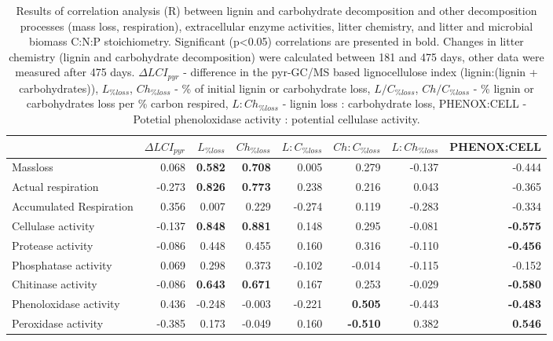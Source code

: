 \documentclass[10pt]{article}
\begin{document}
\begin{flushleft}
\begin{landscape}
\newpage
\begin{table}[h!]
\centering
\caption{Results of correlation analysis (R) between lignin and carbohydrate decomposition and other decomposition processes (mass loss, respiration), extracellular enzyme activities, litter chemistry, and litter and microbial biomass C:N:P stoichiometry. Significant (p\textless 0.05) correlations are presented in bold. Changes in litter chemistry (lignin and carbohydrate decomposition) were calculated between 181 and 475 days, other data were measured after 475 days. $\Delta LCI_{pyr}$ - difference in the pyr-GC/MS based lignocellulose index (lignin:(lignin + carbohydrates)), $L_{\%loss}$, $Ch_{\%loss}$ - \% of initial lignin or carbohydrate loss, $L/C_{\%loss}$, $Ch/C_{\%loss}$  - \% lignin or carbohydrates loss per \% carbon respired, $L:Ch_{\%loss}$ - lignin loss : carbohydrate loss, PHENOX:CELL - Potetial phenoloxidase activity : potential cellulase activity.} 
\label{corrtable2}
{\small
\begin{tabular}{lrrrrrrr}
  \hline
 & $\Delta LCI_{pyr}$ & $L_{\%loss}$ & $Ch_{\%loss}$ & $L:C_{\%loss}$ & $Ch:C_{\%loss}$ & $L:Ch_{\%loss}$ & PHENOX:CELL \\ 
  \hline
Massloss & 0.068 & \textbf{ 0.582 } & \textbf{ 0.708 } & 0.005 & 0.279 & -0.137 & -0.444 \\ 
  Actual respiration & -0.273 & \textbf{ 0.826 } & \textbf{ 0.773 } & 0.238 & 0.216 & 0.043 & -0.365 \\ 
  Accumulated Respiration & 0.356 & 0.007 & 0.229 & -0.274 & 0.119 & -0.283 & -0.334 \\ 
  Cellulase activity & -0.137 & \textbf{ 0.848 } & \textbf{ 0.881 } & 0.148 & 0.295 & -0.081 & \textbf{ -0.575 } \\ 
  Protease activity & -0.086 & 0.448 & 0.455 & 0.160 & 0.316 & -0.110 & \textbf{ -0.456 } \\ 
  Phosphatase activity & 0.069 & 0.298 & 0.373 & -0.102 & -0.014 & -0.115 & -0.152 \\ 
  Chitinase activity & -0.086 & \textbf{ 0.643 } & \textbf{ 0.671 } & 0.167 & 0.253 & -0.029 & \textbf{ -0.580 } \\ 
  Phenoloxidase activity & 0.436 & -0.248 & -0.003 & -0.221 & \textbf{ 0.505 } & -0.443 & \textbf{ -0.483 } \\ 
  Peroxidase activity & -0.385 & 0.173 & -0.049 & 0.160 & \textbf{ -0.510 } & 0.382 & \textbf{ 0.546 } \\ 

\end{tabular}}
\end{table}
\end{landscape}
\end{flushleft}
\end{document}
